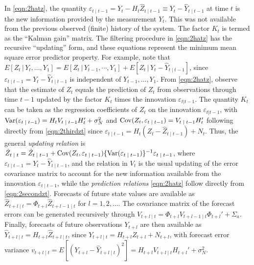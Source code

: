 In \eqref{eqn:2hatz}, the quantity $\varepsilon_{t \;|\; t-1}= Y_t - H_t \hat{Z}_{t \;|\; t-1} \equiv Y_t - \hat{Y}_{t \;|\; t-1}$ at time $t$ is the new information provided by the measurement $Y_t$. This was not available from the previous observed (finite) history of the system. The factor $K_t$ is termed as the ``Kalman gain'' matrix. The filtering procedure in \eqref{eqn:2hatz} has the recursive ``updating'' form, and these equations represent the minimum mean square error predictor property. For example, note that $E[Z_t \,|\,Y_t,\ldots,Y_1]= E[Z_t \,|\,Y_{t-1},\cdots,Y_1] + E[Z_t \,|\, Y_t - \hat{Y}_{t \;|\; t-1}]$, since $\varepsilon_{t \;|\; t-1} = Y_t - \hat{Y}_{t \;|\; t-1}$ is independent of $Y_{t-1}, \ldots, Y_1$. From \eqref{eqn:2hatz}, observe that the estimate of $Z_t$ equals the prediction of $Z_t$ from observations through time $t-1$ updated by the factor $K_t$ times the innovation $\varepsilon_{t|t-1}$. The quantity $K_t$ can be taken as the regression coefficients of $Z_t$ on the innovation $\varepsilon_{t|t-1}$, with $\operatorname{Var}(\varepsilon_{t\;|\; t-1}) = H_t V_{t\;|\; t-1} H_t' + \sigma_N^2$ and $\operatorname{Cov}(Z_t,\varepsilon_{t\;|\; t-1})= V_{t \;|\; t-1} H_t'$ following directly from \eqref{eqn:2thirdzt} since $\varepsilon_{t\;|\; t-1} = H_t (Z_t - \hat{Z}_{t \;|\; t-1}) + N_t$. Thus, the general \emph{updating relation} is $\hat{Z}_{t\;|\;t} = \hat{Z}_{t\;|\; t-1} + \operatorname{Cov}(Z_t,\varepsilon_{t\;|\; t-1}) \{ \operatorname{Var}(\varepsilon_{t\;|\; t-1}) \}^{-1} \varepsilon_{t\;|\; t-1}$, where $\varepsilon_{t \;|\; t-1} = Y_t - \hat{Y}_{t\;|\; t-1}$, and the relation in $V_t$ is the usual updating of the error covariance matrix to account for the new information available from the innovation $\varepsilon_{t\;|\; t-1}$, while the \emph{prediction relations} \eqref{eqn:2hatz} follow directly from \eqref{eqn:2secondzt}. Forecasts of future state values are available as $\hat{Z}_{t+l\;|\;t} = \Phi_{t+l} \hat{Z}_{t+l-1\;|\;t}$ for $l = 1,2,\ldots$. The covariance matrix of the forecast errors can be generated recursively through $V_{t+l\;|\;t} = \Phi_{t+l}V_{t+l-1\;|\;t} \Phi_{t+l}' + \Sigma_a$. Finally, forecasts of future observations $Y_{t+l}$ are then available as $\hat{Y}_{t+l\;|\;t} = H_{t+l} \hat{Z}_{t+l\;|\;t}$, since $Y_{t+l\;|\;t} = H_{t+l} Z_{t+l} + N_{t+l}$, with forecast error variance $v_{t+l\;|\;t} = E[(Y_{t+l} - \hat{Y}_{t+l\;|\;t})^2] = H_{t+l} V_{t+l\;|\;t} H_{t+l}' + \sigma_N^2$.


